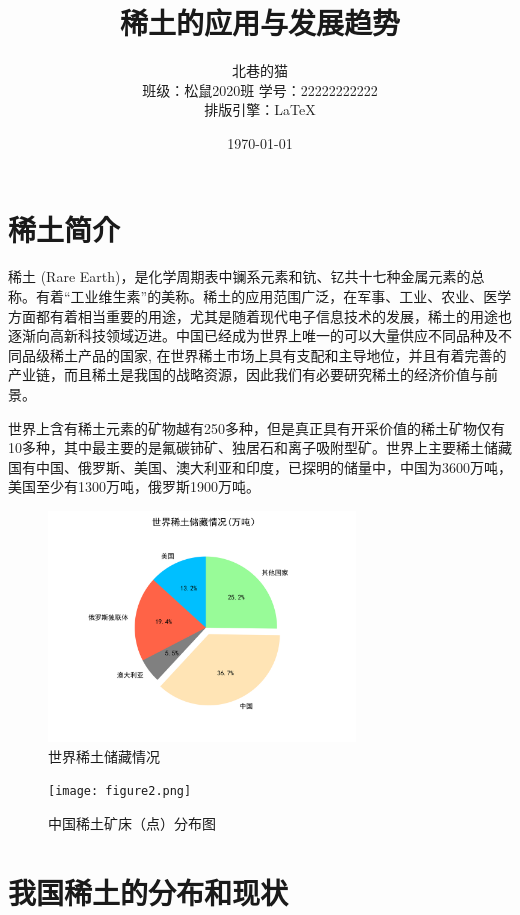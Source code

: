 \documentclass[twoside,twocolumn]{article}
\title{稀土的应用与发展趋势} %
\author{
    \textsc{北巷的猫} \\%
    \normalsize 班级：松鼠2020班 \qquad 学号：22222222222 \\ %
    \normalsize 排版引擎：\LaTeX{}%
}
\date{\today}       %
\begin{document}
\maketitle

\section{稀土简介}
\lettrine[nindent=0em,lines=2]{稀}{土}
(Rare Earth)，是化学周期表中镧系元素和钪、钇共十七种金属元素的总称。有着“工业维生素”的美称。稀土的应用范围广泛，在军事、工业、农业、医学方面都有着相当重要的用途，尤其是随着现代电子信息技术的发展，稀土的用途也逐渐向高新科技领域迈进。中国已经成为世界上唯一的可以大量供应不同品种及不同品级稀土产品的国家, 在世界稀土市场上具有支配和主导地位，并且有着完善的产业链，而且稀土是我国的战略资源，因此我们有必要研究稀土的经济价值与前景。

世界上含有稀土元素的矿物越有250多种，但是真正具有开采价值的稀土矿物仅有10多种，其中最主要的是氟碳铈矿、独居石和离子吸附型矿。世界上主要稀土储藏国有中国、俄罗斯、美国、澳大利亚和印度，已探明的储量中，中国为3600万吨，美国至少有1300万吨，俄罗斯1900万吨。\cite{RN6}\\
\begin{figure}[ht]
  \centering
  \includegraphics[width=22em]{figure4.png}
  \caption{世界稀土储藏情况\cite{RN6}}
\end{figure}

\begin{figure}[ht]
  \centering
  \texttt{[image: figure2.png]}
  \caption{中国稀土矿床（点）分布图\cite{RN39}}
\end{figure}

\section{我国稀土的分布和现状}
\end{document}
